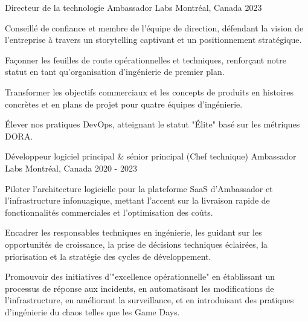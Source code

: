 
\begin{cventries}

  \cventry
    {Directeur de la technologie} %
    {Ambassador Labs} %
    {Montréal, Canada} %
    {2023} %
    {
      \begin{cvitems} %
        \item {Conseillé de confiance et membre de l'équipe de direction, défendant la vision de l'entreprise à travers un storytelling captivant et un positionnement stratégique.}
        \item {Façonner les feuilles de route opérationnelles et techniques, renforçant notre statut en tant qu'organisation d'ingénierie de premier plan.}
        \item {Transformer les objectifs commerciaux et les concepts de produits en histoires concrètes et en plans de projet pour quatre équipes d'ingénierie.}
        \item {Élever nos pratiques DevOps, atteignant le statut "Élite" basé sur les métriques DORA.}
      \end{cvitems}
    }

  \cventry
    {Développeur logiciel principal \& sénior principal (Chef technique)} %
    {Ambassador Labs} %
    {Montréal, Canada} %
    {2020 - 2023} %
    {
      \begin{cvitems} %
        \item {Piloter l'architecture logicielle pour la plateforme SaaS d'Ambassador et l'infrastructure infonuagique, mettant l'accent sur la livraison rapide de fonctionnalités commerciales et l'optimisation des coûts.}
        \item {Encadrer les responsables techniques en ingénierie, les guidant sur les opportunités de croissance, la prise de décisions techniques éclairées, la priorisation et la stratégie des cycles de développement.}
        \item {Promouvoir des initiatives d'"excellence opérationnelle" en établissant un processus de réponse aux incidents, en automatisant les modifications de l'infrastructure, en améliorant la surveillance, et en introduisant des pratiques d'ingénierie du chaos telles que les Game Days.}
      \end{cvitems}
    }


\end{cventries}
